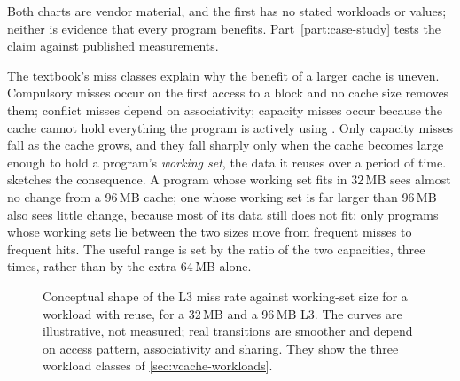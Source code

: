Both charts are vendor material, and the first has no stated workloads or values; neither is evidence that every program benefits. Part~\ref{part:case-study} tests the claim against published measurements.

The textbook's miss classes explain why the benefit of a larger cache is uneven. Compulsory misses occur on the first access to a block and no cache size removes them; conflict misses depend on associativity; capacity misses occur because the cache cannot hold everything the program is actively using \cite[sec.~11.3.2]{sarangi2025basic}. Only capacity misses fall as the cache grows, and they fall sharply only when the cache becomes large enough to hold a program's \emph{working set}, the data it reuses over a period of time.  sketches the consequence. A program whose working set fits in 32\,MB sees almost no change from a 96\,MB cache; one whose working set is far larger than 96\,MB also sees little change, because most of its data still does not fit; only programs whose working sets lie between the two sizes move from frequent misses to frequent hits. The useful range is set by the ratio of the two capacities, three times, rather than by the extra 64\,MB alone.

\begin{figure}[htbp]
\centering
{}
\caption[L3 miss rate against working-set size (conceptual)]{Conceptual shape of the L3 miss rate against working-set size for a workload with reuse, for a 32\,MB and a 96\,MB L3. The curves are illustrative, not measured; real transitions are smoother and depend on access pattern, associativity and sharing. They show the three workload classes of \cref{sec:vcache-workloads}.}
\label{fig:working-set}
\end{figure}

